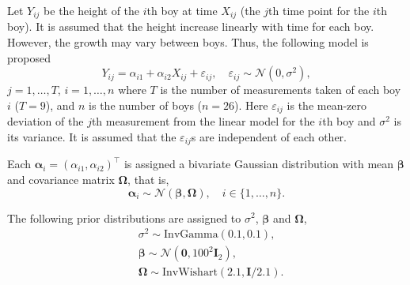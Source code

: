 \documentclass[
]{homework}
\begin{document}
Let \(Y_{ij}\) be the height of the \(i\)th boy at time \(X_{ij}\) (the \(j\)th time point for the \(i\)th boy). It is assumed that the height increase linearly with time for each boy. However, the growth may vary between boys. Thus, the following model is proposed
\[
  Y_{ij} = \alpha_{i1} + \alpha_{i2} X_{ij} + \varepsilon_{ij}, \quad \varepsilon_{ij} \sim \mathcal N(0, \sigma^2),
\]
\(j = 1, \ldots, T\), \(i = 1, \ldots, n\) where \(T\) is the number of measurements taken of each boy \(i\) (\(T = 9\)), and \(n\) is the number of boys (\(n = 26\)). Here \(\varepsilon_{ij}\) is the
mean-zero deviation of the \(j\)th measurement from the linear model for the \(i\)th boy and \(\sigma^2\) is its variance. It is assumed that the \(\varepsilon_{ij}\)s are independent of each
other.

Each \(\boldsymbol\alpha_i = (\alpha_{i1}, \alpha_{i2})^\intercal\) is assigned a bivariate Gaussian distribution with mean \(\boldsymbol\beta\) and covariance matrix \(\boldsymbol\Omega\),
that is,
\[
  \boldsymbol\alpha_i \sim \mathcal N(\boldsymbol\beta, \boldsymbol\Omega), \quad i \in \{1, \ldots, n\}.
\]

The following prior distributions are assigned to \(\sigma^2\), \(\boldsymbol\beta\) and \(\boldsymbol\Omega\),
\begin{align*}
  &\sigma^2 \sim \mathrm{InvGamma}(0.1, 0.1), \\
  &\boldsymbol\beta \sim \mathcal N(\mathbf 0, 100^2\mathbf I_2), \\
  &\boldsymbol\Omega \sim \mathrm{InvWishart}(2.1, \mathbf I/ 2.1).
\end{align*}
\end{document}
